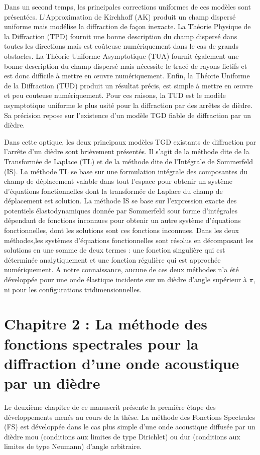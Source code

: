 Dans un second temps, les principales corrections uniformes de ces modèles sont présentées. L'Approximation de Kirchhoff (AK) produit un champ dispersé uniforme mais modélise la diffraction de façon inexacte. La Théorie Physique de la Diffraction (TPD) fournit une bonne description du champ dispersé dans toutes les directions mais est coûteuse numériquement dans le cas de grands obstacles. La Théorie Uniforme Asymptotique (TUA) fournit également une bonne description du champ dispersé mais nécessite le tracé de rayons fictifs et est donc difficile à mettre en œuvre numériquement. Enfin, la Théorie Uniforme de la Diffraction (TUD) produit un résultat précis, est simple à mettre en œuvre et peu couteuse numériquement. Pour ces raisons, la TUD est le modèle asymptotique uniforme le plus usité pour la diffraction par des arrêtes de dièdre. Sa précision repose sur l'existence d'un modèle TGD fiable de diffraction par un dièdre. 

Dans cette optique, les deux principaux modèles TGD existants de diffraction par l'arrête d'un dièdre sont brièvement présentés. Il s'agit de la méthode dite de la Transformée de Laplace (TL) et de la méthode dite de l'Intégrale de Sommerfeld (IS). La méthode TL se base sur une formulation intégrale des composantes du champ de déplacement valable dans tout l'espace pour obtenir un système d'équations fonctionnelles dont la transformée de Laplace du champ de déplacement est solution. La méthode IS se base sur l'expression exacte des potentiels élastodynamiques donnée par Sommerfeld sour forme d'intégrales dépendant de fonctions inconnues pour obtenir un autre système d'équations fonctionnelles, dont les solutions sont ces fonctions inconnues. Dans les deux méthodes,les systèmes d'équations fonctionnelles sont résolus en décomposant les solutions en une somme de deux termes : une fonction singulière qui est déterminée analytiquement et une fonction régulière qui est approchée numériquement. A notre connaissance, aucune de ces deux méthodes n'a été développée pour une onde élastique incidente sur un dièdre d'angle supérieur à $\pi$, ni pour les configurations tridimensionnelles.

\section[Résumé du chapitre 2]{Chapitre 2 : La méthode des fonctions spectrales pour la diffraction d'une onde acoustique par un dièdre}

Le deuxième chapitre de ce manuscrit présente la première étape des développements menés au cours de la thèse. La méthode des Fonctions Spectrales (FS) est développée dans le cas plus simple d'une onde acoustique diffusée par un dièdre mou (conditions aux limites de type Dirichlet) ou dur (conditions aux limites de type Neumann) d'angle arbitraire. 


